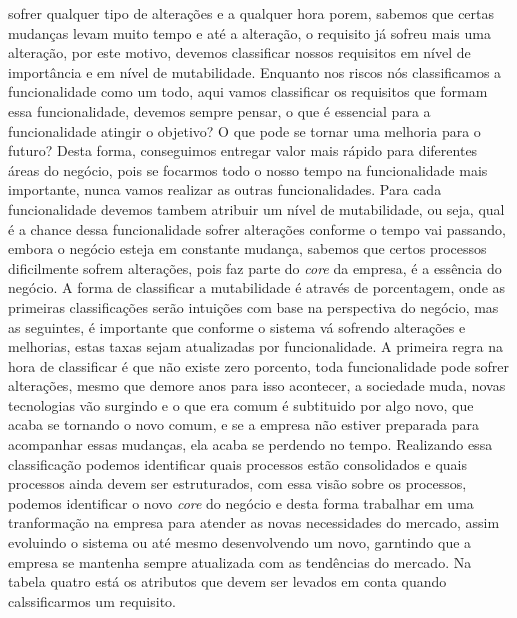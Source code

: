       sofrer qualquer tipo de alterações e a qualquer hora porem, sabemos que certas
      mudanças levam muito tempo e até a alteração, o requisito já sofreu mais uma
      alteração, por este motivo, devemos classificar nossos requisitos em nível
      de importância e em nível de mutabilidade. Enquanto nos riscos nós classificamos
      a funcionalidade como um todo, aqui vamos classificar os requisitos que formam
      essa funcionalidade, devemos sempre pensar, o que é essencial para a funcionalidade
      atingir o objetivo? O que pode se tornar uma melhoria para o futuro? Desta
      forma, conseguimos entregar valor mais rápido para diferentes áreas do negócio,
      pois se focarmos todo o nosso tempo na funcionalidade mais importante, nunca
      vamos realizar as outras funcionalidades. Para cada funcionalidade devemos
      tambem atribuir um nível de mutabilidade, ou seja, qual é a chance dessa
      funcionalidade sofrer alterações conforme o tempo vai passando, embora o
      negócio esteja em constante mudança, sabemos que certos processos dificilmente
      sofrem alterações, pois faz parte do \textit{core} da empresa, é a essência
      do negócio. A forma de classificar a mutabilidade é através de porcentagem,
      onde as primeiras classificações serão intuições com base na perspectiva do
      negócio, mas as seguintes, é importante que conforme o sistema vá sofrendo
      alterações e melhorias, estas taxas sejam atualizadas por funcionalidade.
      A primeira regra na hora de classificar é que não existe zero porcento, toda
      funcionalidade pode sofrer alterações, mesmo que demore anos para isso acontecer,
      a sociedade muda, novas tecnologias vão surgindo e o que era comum é subtituido
      por algo novo, que acaba se tornando o novo comum, e se a empresa não estiver
      preparada para acompanhar essas mudanças, ela acaba se perdendo no tempo.
      Realizando essa classificação podemos identificar quais processos estão
      consolidados e quais processos ainda devem ser estruturados, com essa visão
      sobre os processos, podemos identificar o novo \textit{core} do negócio e
      desta forma trabalhar em uma tranformação na empresa para atender as novas
      necessidades do mercado, assim evoluindo o sistema ou até mesmo desenvolvendo
      um novo, garntindo que a empresa se mantenha sempre atualizada com as tendências
      do mercado. Na tabela quatro está os atributos que devem ser levados em conta
      quando calssificarmos um requisito.\newline

